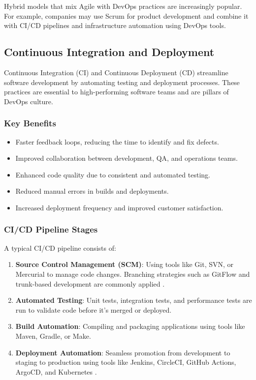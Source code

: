 
Hybrid models that mix Agile with DevOps practices are increasingly popular. For example, companies may use Scrum for product development and combine it with CI/CD pipelines and infrastructure automation using DevOps tools.

\subsection{Continuous Integration and Deployment}
Continuous Integration (CI) and Continuous Deployment (CD) streamline software development by automating testing and deployment processes. These practices are essential to high-performing software teams and are pillars of DevOps culture.

\subsubsection*{Key Benefits}
\begin{itemize}
    \item Faster feedback loops, reducing the time to identify and fix defects.
    \item Improved collaboration between development, QA, and operations teams.
    \item Enhanced code quality due to consistent and automated testing.
    \item Reduced manual errors in builds and deployments.
    \item Increased deployment frequency and improved customer satisfaction.
\end{itemize}

\subsubsection*{CI/CD Pipeline Stages}
A typical CI/CD pipeline consists of:
\begin{enumerate}
    \item \textbf{Source Control Management (SCM)}: Using tools like Git, SVN, or Mercurial to manage code changes. Branching strategies such as GitFlow and trunk-based development are commonly applied \cite{chacon2014progit}.
    \item \textbf{Automated Testing}: Unit tests, integration tests, and performance tests are run to validate code before it's merged or deployed.
    \item \textbf{Build Automation}: Compiling and packaging applications using tools like Maven, Gradle, or Make.
    \item \textbf{Deployment Automation}: Seamless promotion from development to staging to production using tools like Jenkins, CircleCI, GitHub Actions, ArgoCD, and Kubernetes \cite{fowler2006ci}.
\end{enumerate}

